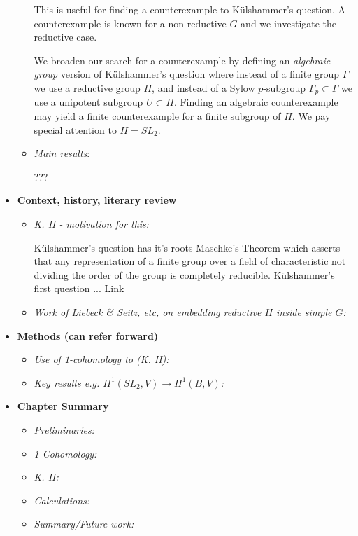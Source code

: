 \begin{itemize}
\begin{itemize}
		
		This is useful for finding a counterexample to K\"ulshammer's question. A counterexample is known for a non-reductive $G$ \cite{weil1964remarks} and we investigate the reductive case. 
		
		
		We broaden our search for a counterexample by defining an \emph{algebraic group} version of K\"ulshammer's question where instead of a finite group $\Gamma$ we use a reductive group $H$, and instead of a Sylow $p$-subgroup $\Gamma_p \subset \Gamma$ we use a unipotent subgroup $U \subset H$. Finding an algebraic counterexample may yield a finite counterexample for a finite subgroup of $H$. We pay special attention to $H = SL_2$.

		\item \emph{Main results}:
		

		???
	\end{itemize}

	\item[] \textbf{Context, history, literary review}
	\begin{itemize}
		\item \emph{K. II - motivation for this:}
		
		K\"ulshammer's question has it's roots Maschke's Theorem which asserts that any representation of a finite group over a field of characteristic not dividing the order of the group is completely reducible. 
		K\"ulshammer's first question ...
		Link
		
		\item \emph{Work of Liebeck \& Seitz, etc, on embedding reductive $H$ inside simple $G$:}
		
	\end{itemize}

	\item[] \textbf{Methods (can refer forward)}
	\begin{itemize}
		\item \emph{Use of 1-cohomology to (K. II):}
		\item \emph{Key results e.g. $H^1(SL_2, V)\rightarrow H^1(B, V)$:}
	\end{itemize}
	
	\item[] \textbf{Chapter Summary}
	\begin{itemize}
		\item \emph{Preliminaries:}
		\item \emph{1-Cohomology:}
		\item \emph{K. II:}
		\item \emph{Calculations:}
		\item \emph{Summary/Future work:}
	\end{itemize}
\end{itemize}

